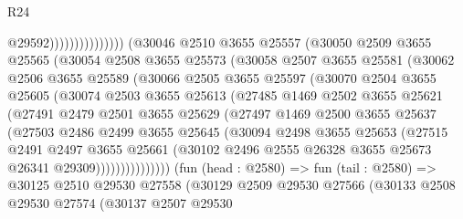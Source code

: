 \begin{lexlean}{R24}
\begin{coremodule}
                                      @29592)))))))))))))))
        (@30046
          @2510
          @3655
          @25557
          (@30050
            @2509
            @3655
            @25565
            (@30054
              @2508
              @3655
              @25573
              (@30058
                @2507
                @3655
                @25581
                (@30062
                  @2506
                  @3655
                  @25589
                  (@30066
                    @2505
                    @3655
                    @25597
                    (@30070
                      @2504
                      @3655
                      @25605
                      (@30074
                        @2503
                        @3655
                        @25613
                        (@27485
                          @1469
                          @2502
                          @3655
                          @25621
                          (@27491
                            @2479
                            @2501
                            @3655
                            @25629
                            (@27497
                              @1469
                              @2500
                              @3655
                              @25637
                              (@27503
                                @2486
                                @2499
                                @3655
                                @25645
                                (@30094
                                  @2498
                                  @3655
                                  @25653
                                  (@27515
                                    @2491
                                    @2497
                                    @3655
                                    @25661
                                    (@30102
                                      @2496
                                      @2555
                                      @26328
                                      @3655
                                      @25673
                                      @26341
                                      @29309)))))))))))))))
        (fun (head : @2580) =>
        fun (tail : @2580) =>
        @30125
          @2510
          @29530
          @27558
          (@30129
            @2509
            @29530
            @27566
            (@30133
              @2508
              @29530
              @27574
              (@30137
                @2507
                @29530

\end{coremodule}
\end{lexlean}
